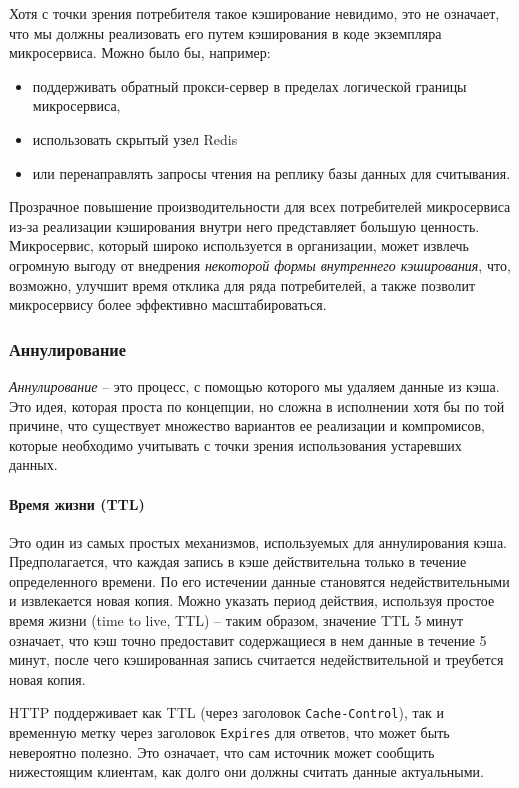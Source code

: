 \documentclass[%
	11pt,
	a4paper,
	utf8,
		]{article}
\begin{document}
Хотя с точки зрения потребителя такое кэширование невидимо, это не означает, что мы должны реализовать его путем кэширования в коде экземпляра микросервиса. Можно было бы, например:
\begin{itemize}
	\item поддерживать обратный прокси-сервер в пределах логической границы микросервиса,
	
	\item использовать скрытый узел Redis 
	
	\item или перенаправлять запросы чтения на реплику базы данных для считывания.
\end{itemize} 

Прозрачное повышение производительности для всех потребителей микросервиса из-за реализации кэширования внутри него представляет большую ценность. Микросервис, который широко используется в организации, может извлечь огромную выгоду от внедрения \emph{некоторой формы внутреннего кэширования}, что, возможно, улучшит время отклика для ряда потребителей, а также позволит микросервису более эффективно масштабироваться.

\subsubsection{Аннулирование}

\emph{Аннулирование} -- это процесс, с помощью которого мы удаляем данные из кэша. Это идея, которая проста по концепции, но сложна в исполнении хотя бы по той причине, что существует множество вариантов ее реализации и компромисов, которые необходимо учитывать с точки зрения использования устаревших данных.

\paragraph{Время жизни (TTL)} Это один из самых простых механизмов, используемых для аннулирования кэша. Предполагается, что каждая запись в кэше действительна только в течение определенного времени. По его истечении данные становятся недействительными и извлекается новая копия. Можно указать период действия, используя простое время жизни (time to live, TTL) -- таким образом, значение TTL 5 минут означает, что кэш точно предоставит содержащиеся в нем данные в течение 5 минут, после чего кэшированная запись считается недействительной и треубется новая копия.

HTTP поддерживает как TTL (через заголовок \verb|Cache-Control|), так и временную метку через заголовок \verb|Expires| для ответов, что может быть невероятно полезно. Это означает, что сам источник может сообщить нижестоящим клиентам, как долго они должны считать данные актуальными. 
\end{document}
